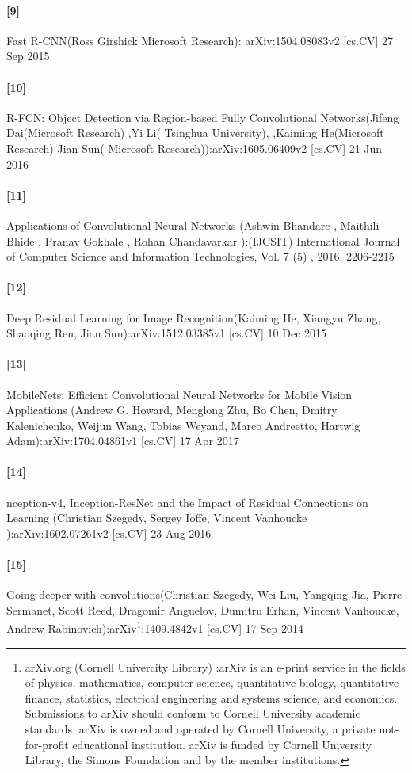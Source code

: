 \documentclass[12pt]{article}
\begin{document}
{{\paragraph*{[9]}
\label{figmesh9} Fast R-CNN(Ross Girshick
Microsoft Research): arXiv:1504.08083v2 [cs.CV] 27 Sep 2015
\paragraph*{[10]} R-FCN: Object Detection via Region-based Fully Convolutional Networks(Jifeng Dai(Microsoft Research) ,Yi Li( Tsinghua University),
,Kaiming He(Microsoft Research)
Jian Sun(
Microsoft Research)):arXiv:1605.06409v2 [cs.CV] 21 Jun 2016
\paragraph{[11]} Applications of Convolutional Neural Networks (Ashwin Bhandare
, Maithili Bhide
, Pranav Gokhale
, Rohan Chandavarkar
):(IJCSIT) International Journal of Computer Science and Information Technologies, Vol. 7 (5) , 2016, 2206-2215

\paragraph{[12]} Deep Residual Learning for Image Recognition(Kaiming He, Xiangyu Zhang, Shaoqing Ren, Jian Sun):arXiv:1512.03385v1 [cs.CV] 10 Dec 2015

\paragraph{[13]}MobileNets: Efficient Convolutional Neural Networks for Mobile Vision Applications (Andrew G. Howard, Menglong Zhu, Bo Chen, 
Dmitry Kalenichenko, Weijun Wang, 
Tobias Weyand, Marco Andreetto,  
Hartwig Adam):arXiv:1704.04861v1 [cs.CV] 17 Apr 2017

\paragraph{[14]}nception-v4, Inception-ResNet and
the Impact of Residual Connections on Learning (Christian Szegedy, Sergey Ioffe, Vincent Vanhoucke ):arXiv:1602.07261v2 [cs.CV] 23 Aug 2016

\paragraph{[15]}Going deeper with convolutions(Christian Szegedy, Wei Liu, Yangqing Jia, Pierre Sermanet, Scott Reed, Dragomir Anguelov, Dumitru Erhan, Vincent Vanhoucke, Andrew Rabinovich):arXiv\footnote{arXiv.org (Cornell Univercity Library) :arXiv is an e-print service in the fields of physics, mathematics, computer science, quantitative biology, quantitative finance, statistics, electrical engineering and systems science, and economics. Submissions to arXiv should conform to Cornell University academic standards. arXiv is owned and operated by Cornell University, a private not-for-profit educational institution. arXiv is funded by Cornell University Library, the Simons Foundation and by the member institutions.}:1409.4842v1 [cs.CV] 17 Sep 2014

}}
\end{document}
